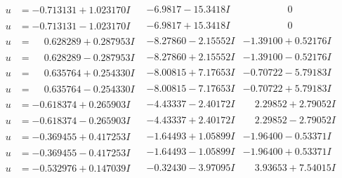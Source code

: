 \documentclass[1p]{elsarticle_modified}
\theoremstyle{definition}
\begin{document}
$$\begin{array}{c|c|c}
\begin{aligned}
u &= -0.713131 + 1.023170 I\end{aligned}
 & -6.9817 - 15.3418 I & \phantom{-0.000000 } 0 \\ \hline\begin{aligned}
u &= -0.713131 - 1.023170 I\end{aligned}
 & -6.9817 + 15.3418 I & \phantom{-0.000000 } 0 \\ \hline\begin{aligned}
u &= \phantom{-}0.628289 + 0.287953 I\end{aligned}
 & -8.27860 - 2.15552 I & -1.39100 + 0.52176 I \\ \hline\begin{aligned}
u &= \phantom{-}0.628289 - 0.287953 I\end{aligned}
 & -8.27860 + 2.15552 I & -1.39100 - 0.52176 I \\ \hline\begin{aligned}
u &= \phantom{-}0.635764 + 0.254330 I\end{aligned}
 & -8.00815 + 7.17653 I & -0.70722 - 5.79183 I \\ \hline\begin{aligned}
u &= \phantom{-}0.635764 - 0.254330 I\end{aligned}
 & -8.00815 - 7.17653 I & -0.70722 + 5.79183 I \\ \hline\begin{aligned}
u &= -0.618374 + 0.265903 I\end{aligned}
 & -4.43337 - 2.40172 I & \phantom{-}2.29852 + 2.79052 I \\ \hline\begin{aligned}
u &= -0.618374 - 0.265903 I\end{aligned}
 & -4.43337 + 2.40172 I & \phantom{-}2.29852 - 2.79052 I \\ \hline\begin{aligned}
u &= -0.369455 + 0.417253 I\end{aligned}
 & -1.64493 + 1.05899 I & -1.96400 - 0.53371 I \\ \hline\begin{aligned}
u &= -0.369455 - 0.417253 I\end{aligned}
 & -1.64493 - 1.05899 I & -1.96400 + 0.53371 I \\ \hline\begin{aligned}
u &= -0.532976 + 0.147039 I\end{aligned}
 & -0.32430 - 3.97095 I & \phantom{-}3.93653 + 7.54015 I \\ \hline\begin{aligned}

\end{aligned}
\end{array}$$
\end{document}
